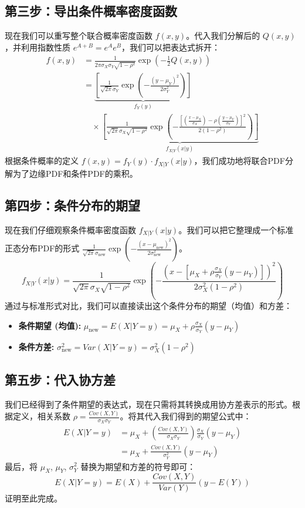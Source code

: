 \documentclass[UTF8]{ctexart}
\begin{document}
\subsection*{第三步：导出条件概率密度函数}

现在我们可以重写整个联合概率密度函数 $f(x,y)$。代入我们分解后的 $Q(x,y)$，并利用指数性质 $e^{A+B} = e^A e^B$，我们可以把表达式拆开：
\begin{align*}
f(x,y) &= \frac{1}{2\pi\sigma_X\sigma_Y\sqrt{1-\rho^2}} \exp\left(-\frac{1}{2}Q(x,y)\right) \\
&= \underbrace{\left[ \frac{1}{\sqrt{2\pi}\sigma_Y} \exp\left( -\frac{(y-\mu_Y)^2}{2\sigma_Y^2} \right) \right]}_{f_Y(y)} \\
& \quad \times \underbrace{\left[ \frac{1}{\sqrt{2\pi}\sigma_X\sqrt{1-\rho^2}} \exp\left( -\frac{\left[ \left(\frac{x-\mu_X}{\sigma_X}\right) - \rho\left(\frac{y-\mu_Y}{\sigma_Y}\right) \right]^2}{2(1-\rho^2)} \right) \right]}_{f_{X|Y}(x|y)}
\end{align*}
根据条件概率的定义 $f(x,y) = f_Y(y) \cdot f_{X|Y}(x|y)$，我们成功地将联合PDF分解为了边缘PDF和条件PDF的乘积。

\subsection*{第四步：条件分布的期望}

现在我们仔细观察条件概率密度函数 $f_{X|Y}(x|y)$。我们可以把它整理成一个标准正态分布PDF的形式 $\frac{1}{\sqrt{2\pi}\sigma_{\text{new}}}\exp(-\frac{(x-\mu_{\text{new}})^2}{2\sigma_{\text{new}}^2})$。
$$
f_{X|Y}(x|y) = \frac{1}{\sqrt{2\pi}\sigma_X\sqrt{1-\rho^2}} \exp\left( -\frac{\left( x - \left[ \mu_X + \rho\frac{\sigma_X}{\sigma_Y}(y-\mu_Y) \right] \right)^2}{2\sigma_X^2(1-\rho^2)} \right)
$$
通过与标准形式对比，我们可以直接读出这个条件分布的期望（均值）和方差：
\begin{itemize}
    \item \textbf{条件期望 (均值):} $\mu_{\text{new}} = E(X|Y=y) = \mu_X + \rho\frac{\sigma_X}{\sigma_Y}(y-\mu_Y)$
    \item \textbf{条件方差:} $\sigma_{\text{new}}^2 = Var(X|Y=y) = \sigma_X^2(1-\rho^2)$
\end{itemize}

\subsection*{第五步：代入协方差}

我们已经得到了条件期望的表达式，现在只需将其转换成用协方差表示的形式。根据定义，相关系数 $\rho = \frac{Cov(X,Y)}{\sigma_X\sigma_Y}$。将其代入我们得到的期望公式中：
\begin{align*}
E(X|Y=y) &= \mu_X + \left( \frac{Cov(X,Y)}{\sigma_X\sigma_Y} \right) \frac{\sigma_X}{\sigma_Y} (y-\mu_Y) \\
&= \mu_X + \frac{Cov(X,Y)}{\sigma_Y^2} (y-\mu_Y)
\end{align*}
最后，将 $\mu_X$, $\mu_Y$, $\sigma_Y^2$ 替换为期望和方差的符号即可：
$$
E(X|Y=y) = E(X) + \frac{Cov(X,Y)}{Var(Y)}(y - E(Y))
$$
证明至此完成。
\end{document}
